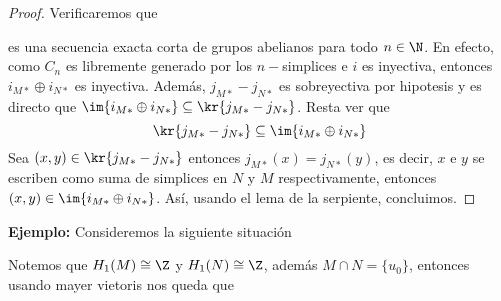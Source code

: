 \documentclass{article}
\begin{document}
\begin{proof}
    Verificaremos que
    
    \centerline{
        \xymatrixcolsep{3pc}
    }

    \vspace{2mm}
    es una secuencia exacta corta de grupos abelianos para todo $n\in\N$. En efecto, como $C_{n}$
    es libremente generado por los $n-$simplices e $i$ es inyectiva, entonces 
    $i_{M*}\oplus i_{N*}$ es inyectiva. Además, $j_{M*}-j_{N*}$ es sobreyectiva por hipotesis y
    es directo que $\im{i_{M*}\oplus i_{N*}}\subseteq\kr{j_{M*}-j_{N*}}$. Resta ver que
    \begin{equation*}
        \kr{j_{M*}-j_{N*}}\subseteq\im{i_{M*}\oplus i_{N*}}
    \end{equation*}
    Sea $(x,y)\in\kr{j_{M*}-j_{N*}}$ entonces $j_{M*}(x)=j_{N*}(y)$, es decir, $x$ e $y$ se 
    escriben como suma de simplices en $N$ y $M$ respectivamente, entonces 
    $(x,y)\in\im{i_{M*}\oplus i_{N*}}$. Así, usando el lema de la serpiente, concluimos.
\end{proof}

\noindent\textbf{Ejemplo:}
Consideremos la siguiente situación
\begin{center}
\end{center}
Notemos que $H_{1}(M)\cong\Z$ y $H_{1}(N)\cong\Z$, además $M\cap N=\{u_{0}\}$, entonces usando
mayer vietoris nos queda que
\end{document}
